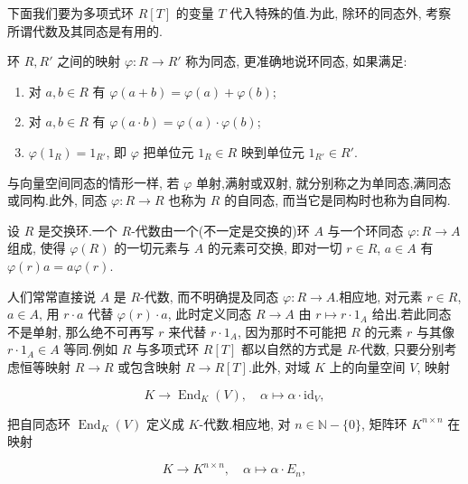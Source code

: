 下面我们要为多项式环 $R[T]$ 的变量 $T$ 代入特殊的值.为此, 除环的同态外, 考察所谓代数及其同态是有用的.

\begin{definition}\label{def:5.1.4}
环 $R, R'$ 之间的映射 $\varphi \colon R \longrightarrow R'$ 称为同态, 更准确地说环同态, 如果满足:
\begin{enumerate}
\item[(i)] 对 $a, b \in R$ 有 $\varphi(a + b) = \varphi(a) + \varphi(b)$;
\item[(ii)] 对 $a, b \in R$ 有 $\varphi(a \cdot b) = \varphi(a) \cdot \varphi(b)$;
\item[(iii)] $\varphi(1_R) = 1_{R'}$, 即 $\varphi$ 把单位元 $1_R \in R$ 映到单位元 $1_{R'} \in R'$.
\end{enumerate}
\end{definition}

与向量空间同态的情形一样, 若 $\varphi$ 单射,满射或双射, 就分别称之为单同态,满同态或同构.此外, 同态 $\varphi \colon R \longrightarrow R$ 也称为 $R$ 的自同态, 而当它是同构时也称为自同构.

\begin{definition}[$R$-代数]\label{def:5.1.5}
设 $R$ 是交换环.一个 $R$-代数由一个(不一定是交换的)环 $A$ 与一个环同态 $\varphi \colon R \longrightarrow A$ 组成, 使得 $\varphi(R)$ 的一切元素与 $A$ 的元素可交换, 即对一切 $r \in R$, $a \in A$ 有 $\varphi(r)a = a\varphi(r)$.
\end{definition}

人们常常直接说 $A$ 是 $R$-代数, 而不明确提及同态 $\varphi \colon R \longrightarrow A$.相应地, 对元素 $r \in R$, $a \in A$, 用 $r \cdot a$ 代替 $\varphi(r) \cdot a$, 此时定义同态 $R \longrightarrow A$ 由 $r \longmapsto r \cdot 1_A$ 给出.若此同态不是单射, 那么绝不可再写 $r$ 来代替 $r \cdot 1_A$, 因为那时不可能把 $R$ 的元素 $r$ 与其像 $r \cdot 1_A \in A$ 等同.例如 $R$ 与多项式环 $R[T]$ 都以自然的方式是 $R$-代数, 只要分别考虑恒等映射 $R \longrightarrow R$ 或包含映射 $R \longrightarrow R[T]$.此外, 对域 $K$ 上的向量空间 $V$, 映射

\[
K \longrightarrow \operatorname{End}_K(V), \quad \alpha \longmapsto \alpha \cdot \mathrm{id}_V,
\]

把自同态环 $\operatorname{End}_K(V)$ 定义成 $K$-代数.相应地, 对 $n \in \mathbb{N} - \{0\}$, 矩阵环 $K^{n \times n}$ 在映射

\[
K \longrightarrow K^{n \times n}, \quad \alpha \longmapsto \alpha \cdot E_n,
\]

